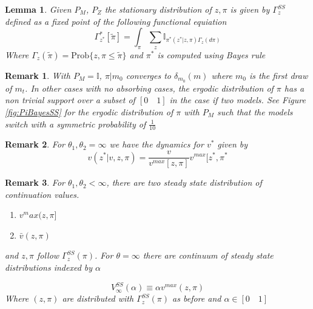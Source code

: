 \documentclass[12pt]{article}
\newtheorem{remark}{Remark}
\newtheorem{lemma}{Lemma}
\begin{document}
\begin{lemma}
Given $P_M$, $P_Z$ the stationary distribution of $z,\pi$ is given by $\Gamma^{SS}_z $ defined as a fixed point of the following functional equiation
\begin{equation}
\Gamma^{*}_{z^{*}}[\tilde {\pi}] =\int_{\pi}\sum_{z} \mathbb{I}_{\pi^*(z^*|z,\pi) \Gamma_z(d \pi)}
\end{equation}
Where $\Gamma_z(\tilde{\pi})= \text{Prob}\{z,\pi \leq \tilde{\pi}\}$ and $\pi^*$ is computed using Bayes rule
\end{lemma}

\begin{remark}
With $P_M=\mathbb{I}$, $\pi|m_0$ converges to $\delta_{m_0}(m)$ where $m_0$ is the first draw of $m_t$. In other cases with no absorbing cases, the ergodic distribution of $\pi$ has a non trivial support over a subset of $[0 \quad 1]$ in the case if two models. See Figure \ref{fig:PiBayesSS} for the ergodic distribution of $\pi$ with $P_M$ such that the models switch with a symmetric probability of $\frac{1}{10}$
\end{remark}


\begin{remark}
For $\theta_1,\theta_2=\infty$ we have the dynamics for $v^*$ given by 
\[ v(z^*|v,z,\pi)=\frac{v}{v^{max}[z,\pi]} v^{max}[z^*,\pi^*\]
\end{remark}

\begin{remark} 
For $\theta_1,\theta_2 <\infty$, there are two steady state distribution of continuation values.
\begin{enumerate}
	\item $v^max(z,\pi]$
	\item $\bar{v}(z,\pi)$
\end{enumerate}
 and $z,\pi$ follow $\Gamma^{SS}_z(\pi)$. For $\theta=\infty$ there are continuum of steady state distributions indexed by $\alpha$ 
 
\[V^{SS}_{\infty}(\alpha) \equiv \alpha v^{max}(z,\pi)\]
Where $(z,\pi)$ are distributed with $\Gamma^{SS}_z(\pi)$ as before and $\alpha \in [0 \quad 1]$
\end{remark}
\end{document}
